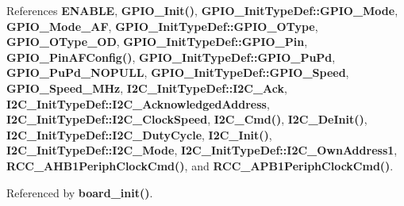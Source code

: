 References \textbf{ E\+N\+A\+B\+LE}, \textbf{ G\+P\+I\+O\+\_\+\+Init()}, \textbf{ G\+P\+I\+O\+\_\+\+Init\+Type\+Def\+::\+G\+P\+I\+O\+\_\+\+Mode}, \textbf{ G\+P\+I\+O\+\_\+\+Mode\+\_\+\+AF}, \textbf{ G\+P\+I\+O\+\_\+\+Init\+Type\+Def\+::\+G\+P\+I\+O\+\_\+\+O\+Type}, \textbf{ G\+P\+I\+O\+\_\+\+O\+Type\+\_\+\+OD}, \textbf{ G\+P\+I\+O\+\_\+\+Init\+Type\+Def\+::\+G\+P\+I\+O\+\_\+\+Pin}, \textbf{ G\+P\+I\+O\+\_\+\+Pin\+A\+F\+Config()}, \textbf{ G\+P\+I\+O\+\_\+\+Init\+Type\+Def\+::\+G\+P\+I\+O\+\_\+\+Pu\+Pd}, \textbf{ G\+P\+I\+O\+\_\+\+Pu\+Pd\+\_\+\+N\+O\+P\+U\+LL}, \textbf{ G\+P\+I\+O\+\_\+\+Init\+Type\+Def\+::\+G\+P\+I\+O\+\_\+\+Speed}, \textbf{ G\+P\+I\+O\+\_\+\+Speed\+\_\+M\+Hz}, \textbf{ I2\+C\+\_\+\+Init\+Type\+Def\+::\+I2\+C\+\_\+\+Ack}, \textbf{ I2\+C\+\_\+\+Init\+Type\+Def\+::\+I2\+C\+\_\+\+Acknowledged\+Address}, \textbf{ I2\+C\+\_\+\+Init\+Type\+Def\+::\+I2\+C\+\_\+\+Clock\+Speed}, \textbf{ I2\+C\+\_\+\+Cmd()}, \textbf{ I2\+C\+\_\+\+De\+Init()}, \textbf{ I2\+C\+\_\+\+Init\+Type\+Def\+::\+I2\+C\+\_\+\+Duty\+Cycle}, \textbf{ I2\+C\+\_\+\+Init()}, \textbf{ I2\+C\+\_\+\+Init\+Type\+Def\+::\+I2\+C\+\_\+\+Mode}, \textbf{ I2\+C\+\_\+\+Init\+Type\+Def\+::\+I2\+C\+\_\+\+Own\+Address1}, \textbf{ R\+C\+C\+\_\+\+A\+H\+B1\+Periph\+Clock\+Cmd()}, and \textbf{ R\+C\+C\+\_\+\+A\+P\+B1\+Periph\+Clock\+Cmd()}.



Referenced by \textbf{ board\+\_\+init()}.


